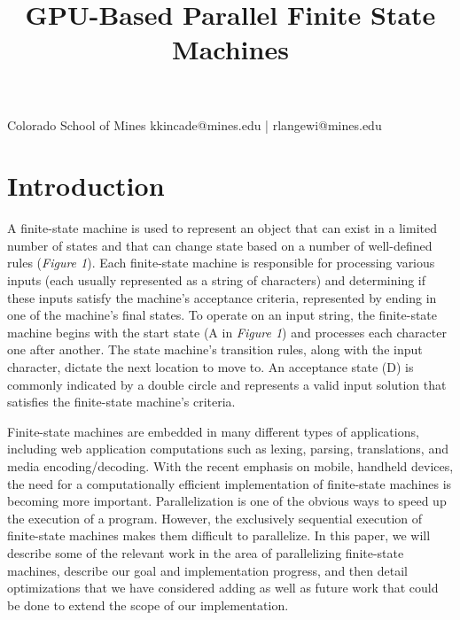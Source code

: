 \documentclass[11pt]{sigplanconf}
\begin{document}
\setlength{\pdfpageheight}{\paperheight}
\setlength{\pdfpagewidth}{\paperwidth}



\title{GPU-Based Parallel Finite State Machines}

           {Colorado School of Mines}
           {kkincade@mines.edu | rlangewi@mines.edu}

\maketitle

\section{Introduction}
 
A finite-state machine is used to represent an object that can exist in a limited number of states and that can change state based on a number of well-defined rules (\textit{Figure 1}). Each finite-state machine is responsible for processing various inputs (each usually represented as a string of characters) and determining if these inputs satisfy the machine's acceptance criteria, represented by ending in one of the machine's final states. To operate on an input string, the finite-state machine begins with the start state (A in \textit{Figure 1}) and processes each character one after another. The state machine's transition rules, along with the input character, dictate the next location to move to. An acceptance state (D) is commonly indicated by a double circle and represents a valid input solution that satisfies the finite-state machine's criteria.

Finite-state machines are embedded in many different types of applications, including web application computations such as lexing, parsing, translations, and media encoding/decoding. With the recent emphasis on mobile, handheld devices, the need for a computationally efficient implementation of finite-state machines is becoming more important. Parallelization is one of the obvious ways to speed up the execution of a program. However, the exclusively sequential execution of finite-state machines makes them difficult to parallelize. In this paper, we will describe some of the relevant work in the area of parallelizing finite-state machines, describe our goal and implementation progress, and then detail optimizations that we have considered adding as well as future work that could be done to extend the scope of our implementation.
\end{document}
